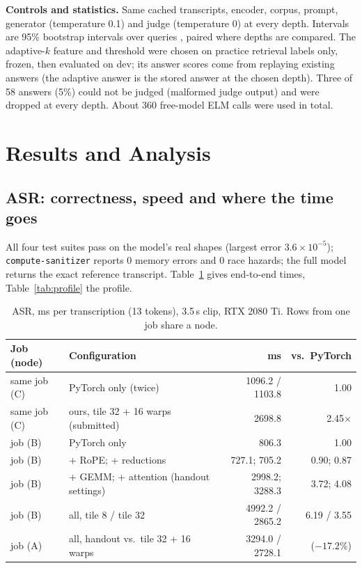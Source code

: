 \documentclass{article}
\begin{document}
\textbf{Controls and statistics.} Same cached transcripts, encoder, corpus, prompt, generator (temperature 0.1) and judge (temperature 0) at every depth. Intervals are 95\% bootstrap intervals over queries \citep{efron1979bootstrap}, paired where depths are compared. The adaptive-$k$ feature and threshold were chosen on practice retrieval labels only, frozen, then evaluated on dev; its answer scores come from replaying existing answers (the adaptive answer is the stored answer at the chosen depth). Three of 58 answers (5\%) could not be judged (malformed judge output) and were dropped at every depth. About 360 free-model ELM calls were used in total.

\section{Results and Analysis}
\label{sec:results}
\subsection{ASR: correctness, speed and where the time goes}
\label{sec:asr-results}
All four test suites pass on the model's real shapes (largest error $3.6\times10^{-5}$); \texttt{compute-sanitizer} reports 0 memory errors and 0 race hazards; the full model returns the exact reference transcript. Table~\ref{tab:asr-e2e} gives end-to-end times, Table~\ref{tab:profile} the profile.

\begin{table}[h]
\centering\small
\caption{ASR, ms per transcription (13 tokens), 3.5\,s clip, RTX 2080 Ti. Rows from one job share a node.}
\label{tab:asr-e2e}
\begin{tabular}{llrr}
\toprule
Job (node) & Configuration & ms & vs.\ PyTorch\\
\midrule
same job (C) & PyTorch only (twice) & 1096.2 / 1103.8 & 1.00\\
same job (C) & ours, tile 32 + 16 warps (submitted) & 2698.8 & 2.45$\times$\\
\midrule
job (B) & PyTorch only & 806.3 & 1.00\\
job (B) & + RoPE; + reductions & 727.1; 705.2 & 0.90; 0.87\\
job (B) & + GEMM; + attention (handout settings) & 2998.2; 3288.3 & 3.72; 4.08\\
job (B) & all, tile 8 / tile 32 & 4992.2 / 2865.2 & 6.19 / 3.55\\
job (A) & all, handout vs.\ tile 32 + 16 warps & 3294.0 / 2728.1 & ($-17.2\%$)\\
\bottomrule
\end{tabular}
\end{table}
\end{document}
